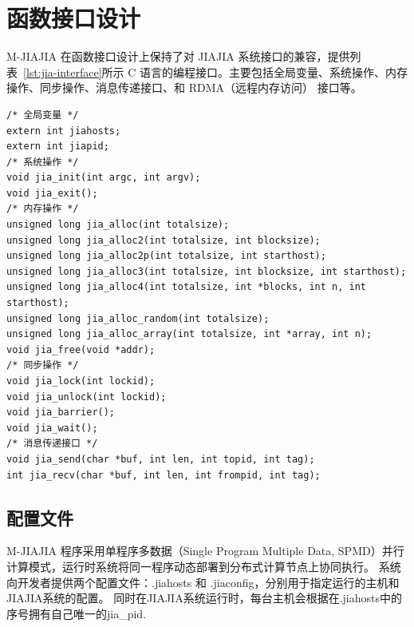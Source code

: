 {    \section{函数接口设计}
    M-JIAJIA 在函数接口设计上保持了对 JIAJIA 系统接口的兼容，提供列表~\ref{lst:jia-interface}所示 C 语言的编程接口。主要包括全局变量、系统操作、内存操作、同步操作、消息传递接口、和 RDMA（远程内存访问） 接口等。
    \begin{lstlisting}[style=CStyle, caption={M-JIAJIA C 接口总览}, label={lst:jia-interface}]
/* 全局变量 */
extern int jiahosts;
extern int jiapid;
/* 系统操作 */
void jia_init(int argc, int argv);
void jia_exit();
/* 内存操作 */
unsigned long jia_alloc(int totalsize);
unsigned long jia_alloc2(int totalsize, int blocksize);
unsigned long jia_alloc2p(int totalsize, int starthost);
unsigned long jia_alloc3(int totalsize, int blocksize, int starthost);
unsigned long jia_alloc4(int totalsize, int *blocks, int n, int starthost);
unsigned long jia_alloc_random(int totalsize);
unsigned long jia_alloc_array(int totalsize, int *array, int n);
void jia_free(void *addr);
/* 同步操作 */
void jia_lock(int lockid);
void jia_unlock(int lockid);
void jia_barrier();
void jia_wait();
/* 消息传递接口 */
void jia_send(char *buf, int len, int topid, int tag);
int jia_recv(char *buf, int len, int frompid, int tag);
    \end{lstlisting}

    \subsection{配置文件}
    M-JIAJIA 程序采用单程序多数据（Single Program Multiple Data, SPMD）并行计算模式，运行时系统将同一程序动态部署到分布式计算节点上协同执行。
    系统向开发者提供两个配置文件：.jiahosts 和 .jiaconfig，分别用于指定运行的主机和JIAJIA系统的配置。
    同时在JIAJIA系统运行时，每台主机会根据在.jiahosts中的序号拥有自己唯一的jia\_pid.

}
